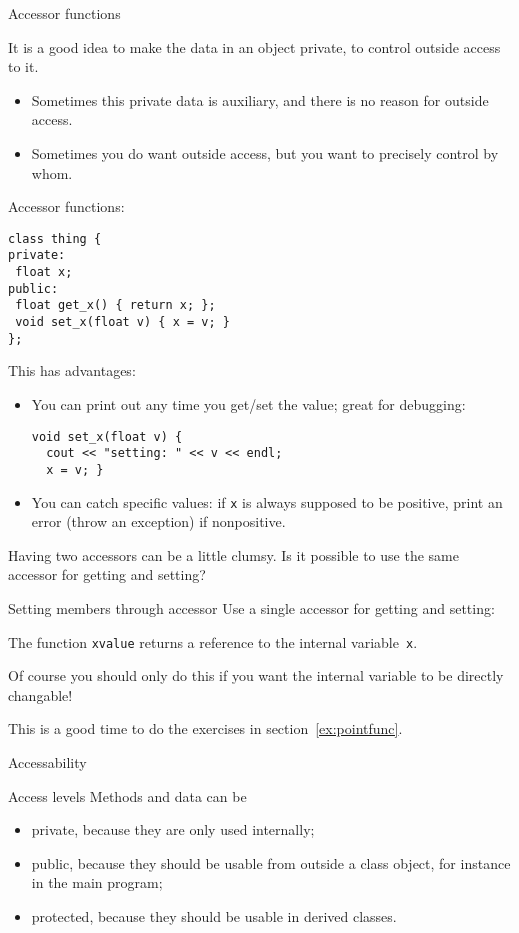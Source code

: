  {Accessor functions}

It is a good idea to make the data in an object private,
to control outside access to it.
\begin{itemize}
\item Sometimes this private data is auxiliary, and there is no reason
  for outside access.
\item Sometimes you do want outside access, but you want to precisely
  control by whom.
\end{itemize}

Accessor functions:
\begin{lstlisting}
class thing {
private:
 float x;
public:
 float get_x() { return x; };
 void set_x(float v) { x = v; }
};
\end{lstlisting}
This has advantages:
\begin{itemize}
\item You can print out any time you get/set the value; great for
  debugging:
\begin{lstlisting}
void set_x(float v) {
  cout << "setting: " << v << endl;
  x = v; }
\end{lstlisting}
\item You can catch specific values: if \lstinline{x} is always supposed to be
  positive, print an error (throw an exception) if nonpositive.
\end{itemize}

Having two accessors can be a little clumsy. Is it possible to use the
same accessor for getting and setting?

\begin{block}{Setting members through accessor}
  \label{sl:setmember}
  Use a single accessor for getting and setting:

  The function \lstinline{xvalue} returns a reference to the internal
  variable~\lstinline{x}.
\end{block}

Of course you should only do this if you want the internal variable to
be directly changable!

\begin{exercise}
  This is a good time to do the exercises in section~\ref{ex:pointfunc}.
\end{exercise}

 {Accessability}

\begin{block}{Access levels}
  \label{sl:private-etc}
  Methods and data can be 
  \begin{itemize}
  \item private, because they are only used internally;
  \item public, because they should be usable from outside a class
    object, for instance in the main program;
  \item protected, because they should be usable in derived classes.
  \end{itemize}
\end{block}

